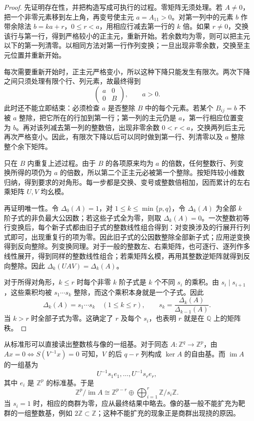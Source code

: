 \begin{proof}
	先证明存在性，并把构造写成可执行的过程。零矩阵无须处理。若 \(A\ne0\)，把一个非零元素移到左上角，再变号使主元 \(a=A_{11}>0\)。对第一列中的元素 \(b\) 作带余除法 \(b=ka+r\)，\(0\le r<a\)，用相应行减去第一行的 \(k\) 倍。如果 \(r\ne0\)，交换该行与第一行，得到严格较小的正主元，重新开始。若余数均为零，则可以把主元以下的第一列清零。以相同方法对第一行作列变换；一旦出现非零余数，交换至主元位置并重新开始。

	每次需要重新开始时，正主元严格变小，所以这种下降只能发生有限次。两次下降之间只须处理有限个行、列元素，故最终得到
	\[
		\begin{pmatrix}a&0\\0&B\end{pmatrix},\qquad a>0.
	\]
	此时还不能立即结束：必须检查 \(a\) 是否整除 \(B\) 中的每个元素。若某个 \(B_{ij}=b\) 不被 \(a\) 整除，把它所在的行加到第一行；第一列的主元仍是 \(a\)，第一行相应位置变为 \(b\)。再对该列减去第一列的整数倍，出现非零余数 \(0<r<a\)，交换两列后主元再次严格变小。因此，有限次下降以后可以同时做到第一行、列清零以及 \(a\) 整除整个余下矩阵。

	只在 \(B\) 内重复上述过程。由于 \(B\) 的各项原来均为 \(a\) 的倍数，任何整数行、列变换所得的项仍为 \(a\) 的倍数，所以第二个正主元必被第一个整除。按矩阵较小维数归纳，得到要求的对角形。每一步都是交换、变号或整数倍相加，因而累计的左右乘矩阵 \(U,V\) 均幺模。

	再证明唯一性。令 \(\Delta_0(A)=1\)，对 \(1\le k\le\min\{p,q\}\)，令 \(\Delta_k(A)\) 为全部 \(k\) 阶子式的非负最大公因数；若这些子式全为零，则取 \(\Delta_k(A)=0\)。一次整数初等行变换后，每个新子式都由旧子式的整数线性组合得到：对变换涉及的行展开行列式即可，出现重复行的项为零。因此旧子式的公因数整除全部新子式；应用逆变换得到反向整除。列变换同理。对于一般的整数左、右乘矩阵，也可逐行、逐列作多线性展开，得到同样的整数线性组合；若乘矩阵幺模，再用其整数逆矩阵就得到反向整除。因此 \(\Delta_k(UAV)=\Delta_k(A)\)。

	对于所得对角形，\(k\le r\) 时每个非零 \(k\) 阶子式是 \(k\) 个不同 \(s_i\) 的乘积。由 \(s_i\mid s_{i+1}\)，这些乘积均被 \(s_1\cdots s_k\) 整除，而这个乘积本身就是一个子式。因此
	\[
		\Delta_k(A)=s_1\cdots s_k\quad(1\le k\le r),
		\qquad s_k=\frac{\Delta_k(A)}{\Delta_{k-1}(A)}.
	\]
	当 \(k>r\) 时全部子式为零。这确定了 \(r\) 及每个 \(s_i\)，也表明 \(r\) 就是在 \(\mathbb Q\) 上的矩阵秩。
\end{proof}

从标准形可以直接读出整数核与像的一组基。对于同态 \(A:\mathbb Z^q\to\mathbb Z^p\)，由 \(Ax=0\iff S(V^{-1}x)=0\) 可知，\(V\) 的后 \(q-r\) 列构成 \(\ker A\) 的自由基。而 \(\operatorname{im}A\) 的一组基为
\[
	U^{-1}s_1e_1,\ldots,U^{-1}s_re_r,
\]
其中 \(e_i\) 是 \(\mathbb Z^p\) 的标准基。于是
\[
	\mathbb Z^p/\operatorname{im}A
	\cong\mathbb Z^{p-r}\oplus\bigoplus_{i=1}^r\mathbb Z/s_i\mathbb Z.
\]
当 \(s_i=1\) 时，相应的商群为零，应从最终结果中略去。像的基一般不能扩充为靶群的一组整数基，例如 \(2\mathbb Z\subset\mathbb Z\)；这种不能扩充的现象正是商群出现挠的原因。

